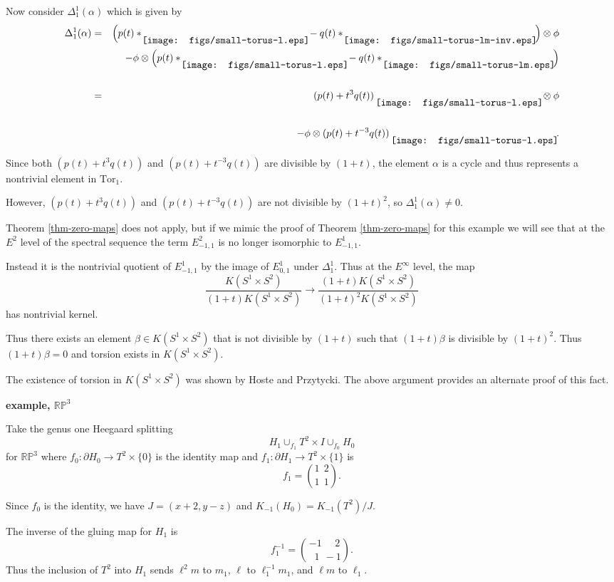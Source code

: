 \documentclass{slides}
\newcommand{\ot}{\otimes}
\newcommand{\torusL}{\raisebox{-7pt}{\mbox{}\hspace{-5pt}
                  \texttt{[image: figs/small-torus-l.eps]}\hspace{-2pt}\mbox{}}}
\newcommand{\torusLM}{\raisebox{-7pt}{\mbox{}\hspace{-5pt}
                  \texttt{[image: figs/small-torus-lm.eps]}\hspace{-2pt}\mbox{}}}
\newcommand{\torusLMinv}{\raisebox{-7pt}{\mbox{}\hspace{-5pt}
                  \texttt{[image: figs/small-torus-lm-inv.eps]}\hspace{-2pt}\mbox{}}}
\theoremstyle{definition}
\begin{document}
\begin{slide}
Now consider $\Delta^1_1(\alpha)$ which is given by
\begin{eqnarray}
\Delta^1_1(\alpha) & = & \Big( p(t)*\torusL - q(t)*\torusLMinv \Big) \ot
\phi \nonumber \\
& & - \phi \ot \Big( p(t)*\torusL - q(t)*\torusLM \Big) \nonumber \\
\nonumber \\
& = & (p(t)+t^3q(t))~\torusL \ot \phi \nonumber \\
\nonumber \\
& & - \phi \ot (p(t)+t^{-3}q(t))~\torusL. \nonumber
\end{eqnarray}

Since both $(p(t)+t^3q(t))$ and $(p(t)+t^{-3}q(t))$ are divisible by $(1+t)$, the
element $\alpha$ is a cycle and thus represents a nontrivial element in
$\mathrm{Tor}_1$.

However, $(p(t)+t^3q(t))$ and $(p(t)+t^{-3}q(t))$ are
not divisible by $(1+t)^2$, so $\Delta^1_1(\alpha) \neq 0$.
\end{slide}

\begin{slide}
Theorem \ref{thm-zero-maps} does not apply, but if we mimic the proof
of Theorem \ref{thm-zero-maps} for this example
we will see that at the $E^2$ level of the spectral sequence the term
$E^2_{-1,1}$ is no longer isomorphic to $E^1_{-1,1}$.

Instead it is the nontrivial
quotient of $E^1_{-1,1}$ by the image of $E^1_{0,1}$ under $\Delta^1_1$.
Thus at the $E^{\infty}$ level, the map
\[
\frac{K(S^1 \times S^2)}{(1+t)K(S^1 \times S^2)} \to
\frac{(1+t)K(S^1 \times S^2)}{(1+t)^2K(S^1 \times S^2)}
\]
has nontrivial kernel.

Thus there exists an element $\beta \in K(S^1 \times S^2)$
that is not divisible by $(1+t)$ such that $(1+t) \beta$ is divisible by $(1+t)^2$.
Thus $(1+t) \beta = 0$ and torsion exists in $K(S^1 \times S^2)$.

The existence of torsion in $K(S^1 \times S^2)$ was shown by Hoste and Przytycki.
The above argument provides an alternate proof of this fact.
\end{slide}

\begin{slide}
\textbf{example, $\mathbb{RP}^3$}

Take the genus one Heegaard splitting
$$H_1 \cup_{f_1} T^2 \times I \cup_{f_0} H_0$$ for $\mathbb{RP}^3$ where
$f_0 : \partial H_0 \to T^2 \times \{0\}$ is the identity
map and
$f_1 : \partial H_1 \to T^2 \times \{1\}$ is
$$f_1 = \binom{1~~2}{1~~1}.$$

Since $f_0$ is the identity, we have
$J = (x+2, y-z)$ and $K_{-1}(H_0) = K_{-1}(T^2) / J$.

The inverse of the gluing map for $H_1$ is
\[f^{-1}_1 = \binom{-1~~~~~~2}{~~~1~~-1}.\]  Thus the inclusion of $T^2$ into $H_1$
sends $\ell^2 m$ to $m_1$, $\ell$ to $\ell_1^{-1} m_1$, and
$\ell m$ to $\ell_1$.
\end{slide}
\end{document}
